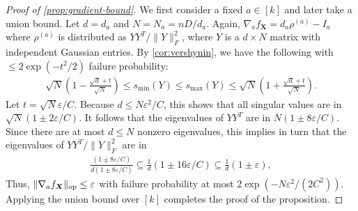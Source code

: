 \documentclass{article}
\DeclarePairedDelimiter{\norm}{\lVert}{\rVert}
\newcommand{\op}{\operatorname{op}}
\renewcommand{\vec}{\bm}
\newcommand\eps{\varepsilon}
\newcommand\cN{\mathcal{N}}
\newcommand{\CF}[1]{{\color{purple}[CF: #1]}}
\begin{document}
\begin{proof}[Proof of \cref{prop:gradient-bound}]
We first consider a fixed $a\in[k]$ and later take a union bound.
Let $d = d_a$ and $N = N_a = n D/d_a$.
Again, $\nabla_a f_{\vec X} = d_a \rho^{(a)} - I_a$ where $\rho^{(a)}$ is distributed as $Y Y^T/\|Y\|_F^2$, where $Y$ is a $d \times N$ matrix with independent Gaussian entries.
By \cref{cor:vershynin}, we have the following with $\leq 2 \exp(-t^2/2)$ failure probability:
\begin{align*}
  \sqrt{N} \left( 1 -  \frac{\sqrt{d} + t }{\sqrt{N}}  \right)\leq s_{\min}(Y) \leq s_{\max}(Y) \leq  \sqrt{N} \left( 1 + \frac{\sqrt{d} + t }{\sqrt{N}} \right).
\end{align*}
Let $t = \sqrt{N} \eps / C$.
Because $d \leq N \eps^2 / C$, this shows that all singular values are in $\sqrt{N} \left( 1 \pm 2\eps/C \right)$.
It follows that the eigenvalues of $YY^T$ are in $N \left( 1 \pm 8\eps/C \right)$.
Since there are at most $d \leq N$ nonzero eigenvalues, this implies in turn that the eigenvalues of $Y Y^T/\|Y\|_F^2$ are in
\begin{align*}
\frac {\left( 1 \pm 8\eps/C \right)} {d \left( 1 \pm 8\eps/C \right)} \subseteq \frac1d \left( 1 \pm 16\eps/C \right) \subseteq \frac1d \left( 1 \pm \eps \right),
\end{align*}
Thus,
$\norm{\nabla_a f_{\vec X}}_{\op} \leq \eps$
with failure probability at most $2 \exp(-N \eps^2/(2C^2))$.
Applying the union bound over $[k]$ completes the proof of the proposition.
\end{proof}

\end{document}
